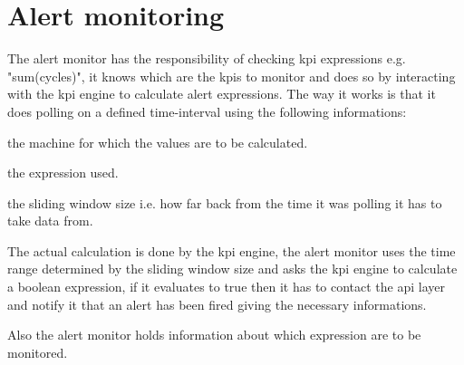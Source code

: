 \chapter{Alert monitoring}
\hypertarget{md_doc_2_alert__monitor}{}\label{md_doc_2_alert__monitor}
\label{md_doc_2_alert__monitor_autotoc_md15}%
%


The alert monitor has the responsibility of checking kpi expressions e.\+g. "{}sum(cycles)"{}, it knows which are the kpis to monitor and does so by interacting with the kpi engine to calculate alert expressions. The way it works is that it does polling on a defined time-\/interval using the following informations\+:
\begin{DoxyItemize}
\item the machine for which the values are to be calculated.
\item the expression used.
\item the sliding window size i.\+e. how far back from the time it was polling it has to take data from.
\end{DoxyItemize}

The actual calculation is done by the kpi engine, the alert monitor uses the time range determined by the sliding window size and asks the kpi engine to calculate a boolean expression, if it evaluates to true then it has to contact the api layer and notify it that an alert has been fired giving the necessary informations. ~\newline


Also the alert monitor holds information about which expression are to be monitored. 